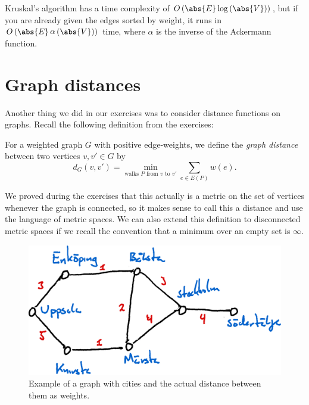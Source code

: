 \documentclass[nobib]{tufte-handout}
\begin{document}
\begin{remark}
  Kruskal's algorithm has a time complexity of $O\left(\abs{E}\log\left(\abs{V}\right)\right)$, but if you are already given the edges sorted by weight, it runs in $O\left(\abs{E}\mathop{\alpha}\left(\abs{V}\right)\right)$ time, where $\alpha$ is the inverse of the Ackermann function.
\end{remark}

\section{Graph distances}

Another thing we did in our exercises was to consider distance functions on graphs. Recall the following definition from the exercises:

\begin{definition}
  For a weighted graph $G$ with positive edge-weights, we define the \emph{graph distance} between two vertices $v, v' \in G$ by
  $$d_G(v, v') = \min_{\text{walks }P\text{ from }v\text{ to }v'} \sum_{e \in E(P)} w(e).$$
\end{definition}

We proved during the exercises that this actually is a metric on the set of vertices whenever the graph is connected, so it makes sense to call this a distance and use the language of metric spaces. We can also extend this definition to disconnected metric spaces if we recall the convention that a minimum over an empty set is $\infty$.

\begin{figure}
    \centering
    \includegraphics{graphics/L6_prim_kruskal_dijkstra/distance.png}
    \caption{Example of a graph with cities and the actual distance between them as weights.}
    \label{fig:distance}
\end{figure}
\end{document}

